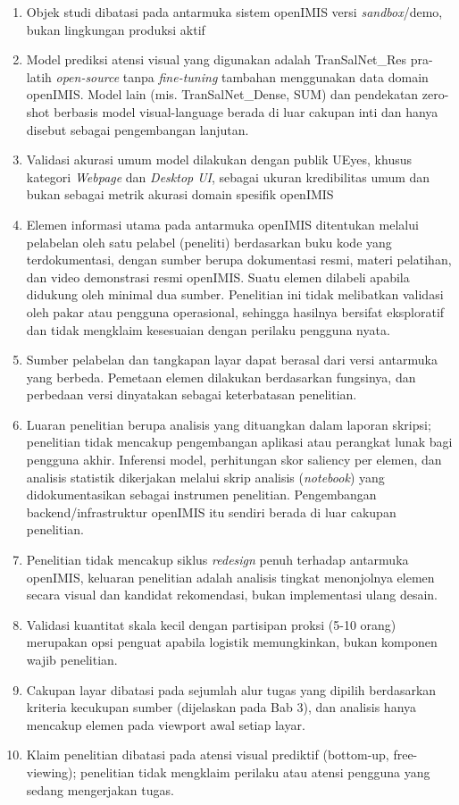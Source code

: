 \begin{enumerate}
  \item Objek studi dibatasi pada antarmuka sistem openIMIS versi \textit{sandbox}/demo, bukan lingkungan produksi aktif
  \item Model prediksi atensi visual yang digunakan adalah TranSalNet\_Res pra-latih \textit{open-source} tanpa \textit{fine-tuning} tambahan menggunakan data domain openIMIS. Model lain (mis. TranSalNet\_Dense, SUM) dan pendekatan zero-shot berbasis model visual-language berada di luar cakupan inti dan hanya disebut sebagai pengembangan lanjutan.
  \item Validasi akurasi umum model dilakukan dengan publik UEyes, khusus kategori \textit{Webpage} dan \textit{Desktop UI}, sebagai ukuran kredibilitas umum dan bukan sebagai metrik akurasi domain spesifik openIMIS
  \item Elemen informasi utama pada antarmuka openIMIS ditentukan melalui pelabelan oleh satu pelabel (peneliti) berdasarkan buku kode yang terdokumentasi, dengan sumber berupa dokumentasi resmi, materi pelatihan, dan video demonstrasi resmi openIMIS. Suatu elemen dilabeli apabila didukung oleh minimal dua sumber. Penelitian ini tidak melibatkan validasi oleh pakar atau pengguna operasional, sehingga hasilnya bersifat eksploratif dan tidak mengklaim kesesuaian dengan perilaku pengguna nyata.
  \item Sumber pelabelan dan tangkapan layar dapat berasal dari versi antarmuka yang berbeda. Pemetaan elemen dilakukan berdasarkan fungsinya, dan perbedaan versi dinyatakan sebagai keterbatasan penelitian.
  \item Luaran penelitian berupa analisis yang dituangkan dalam laporan skripsi; penelitian tidak mencakup pengembangan aplikasi atau perangkat lunak bagi pengguna akhir. Inferensi model, perhitungan skor saliency per elemen, dan analisis statistik dikerjakan melalui skrip analisis (\textit{notebook}) yang didokumentasikan sebagai instrumen penelitian. Pengembangan backend/infrastruktur openIMIS itu sendiri berada di luar cakupan penelitian.
  \item Penelitian tidak mencakup siklus \textit{redesign} penuh terhadap antarmuka openIMIS, keluaran penelitian adalah analisis tingkat menonjolnya elemen secara visual dan kandidat rekomendasi, bukan implementasi ulang desain.
  \item Validasi kuantitat skala kecil dengan partisipan proksi (5-10 orang) merupakan opsi penguat apabila logistik memungkinkan, bukan komponen wajib penelitian.
  \item Cakupan layar dibatasi pada sejumlah alur tugas yang dipilih berdasarkan kriteria kecukupan sumber (dijelaskan pada Bab 3), dan analisis hanya mencakup elemen pada viewport awal setiap layar.
  \item Klaim penelitian dibatasi pada atensi visual prediktif (bottom-up, free-viewing); penelitian tidak mengklaim perilaku atau atensi pengguna yang sedang mengerjakan tugas.
\end{enumerate}

